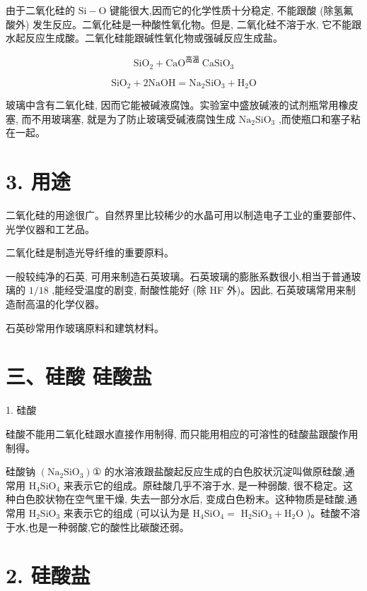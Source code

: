 \documentclass[10pt]{article}
\begin{document}
由于二氧化硅的 \(\mathrm{{Si}} - \mathrm{O}\) 键能很大,因而它的化学性质十分稳定, 不能跟酸 (除氢氟酸外) 发生反应。二氧化硅是一种酸性氧化物。但是, 二氧化硅不溶于水, 它不能跟水起反应生成酸。二氧化硅能跟碱性氧化物或强碱反应生成盐。

\[
{\mathrm{{SiO}}}_{2} + {\mathrm{{CaO}}}^{\text{高温 }}{\mathrm{{CaSiO}}}_{3}
\]

\[
{\mathrm{{SiO}}}_{2} + 2\mathrm{{NaOH}} = {\mathrm{{Na}}}_{2}{\mathrm{{SiO}}}_{3} + {\mathrm{H}}_{2}\mathrm{O}
\]

玻璃中含有二氧化硅, 因而它能被碱液腐蚀。实验室中盛放碱液的试剂瓶常用橡皮塞, 而不用玻璃塞, 就是为了防止玻璃受碱液腐蚀生成 \({\mathrm{{Na}}}_{2}{\mathrm{{SiO}}}_{3}\) ,而使瓶口和塞子粘在一起。

\section*{3. 用途}

二氧化硅的用途很广。自然界里比较稀少的水晶可用以制造电子工业的重要部件、光学仪器和工艺品。

二氧化硅是制造光导纤维的重要原料。

一般较纯净的石英, 可用来制造石英玻璃。石英玻璃的膨胀系数很小,相当于普通玻璃的 \(1/{18}\) ,能经受温度的剧变, 耐酸性能好 (除 HF 外)。因此, 石英玻璃常用来制造耐高温的化学仪器。

石英砂常用作玻璃原料和建筑材料。

\section*{三、硅酸 硅酸盐}

1. 硅酸

硅酸不能用二氧化硅跟水直接作用制得, 而只能用相应的可溶性的硅酸盐跟酸作用制得。

硅酸钠 \(\left( {{\mathrm{{Na}}}_{2}{\mathrm{{SiO}}}_{3}}\right) \text{①}\) 的水溶液跟盐酸起反应生成的白色胶状沉淀叫做原硅酸,通常用 \({\mathrm{H}}_{4}{\mathrm{{SiO}}}_{4}\) 来表示它的组成。原硅酸几乎不溶于水, 是一种弱酸, 很不稳定。这种白色胶状物在空气里干燥, 失去一部分水后, 变成白色粉末。这种物质是硅酸,通常用 \({\mathrm{H}}_{2}{\mathrm{{SiO}}}_{3}\) 来表示它的组成 (可以认为是 \({\mathrm{H}}_{4}{\mathrm{{SiO}}}_{4} =\) \({\mathrm{H}}_{2}{\mathrm{{SiO}}}_{3} + {\mathrm{H}}_{2}\mathrm{O}\) )。硅酸不溶于水,也是一种弱酸,它的酸性比碳酸还弱。

\section*{2. 硅酸盐}
\end{document}
